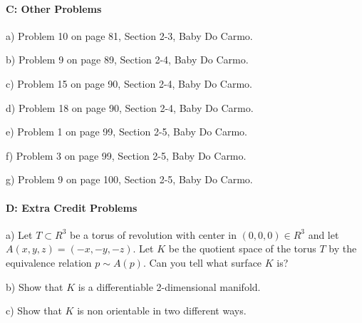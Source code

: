 \documentclass[12pt]{article}
\begin{document}
\paragraph{C: Other Problems}
\begin{itemize}
{\item a) Problem 10 on page 81, Section 2-3, Baby Do Carmo.}
{\item b) Problem 9 on page 89, Section 2-4, Baby Do Carmo.}
{\item c) Problem 15 on page 90, Section 2-4, Baby Do Carmo.}
{\item d) Problem 18 on page 90, Section 2-4, Baby Do Carmo.}
{\item e) Problem 1 on page 99, Section 2-5, Baby Do Carmo.}
{\item f) Problem 3 on page 99, Section 2-5, Baby Do Carmo.}
{\item g) Problem 9 on page 100, Section 2-5, Baby Do Carmo.}
\end{itemize}


\paragraph{D: Extra Credit Problems}
\begin{itemize}
{\item a) Let $T\subset R^3$ be a torus of revolution with center in 
$(0,0,0)\in R^3$ and let $A(x,y,z)=(-x,-y,-z)$.
Let $K$ be the quotient space of the torus $T$ by the equivalence 
relation $p\sim A(p)$.  Can you tell what surface $K$ is? }
{\item b) Show that $K$ is a differentiable 2-dimensional manifold.}
{\item c) Show that $K$ is non orientable in two different ways.} 
\end{itemize}
\end{document}
